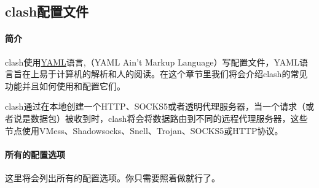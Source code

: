 \subsection{clash配置文件}

\paragraph{简介}clash使用\href{https://yaml.org/}{YAML}语言,（YAML Ain't Markup Language）写配置文件，YAML语言旨在上易于计算机的解析和人的阅读。在这个章节里我们将会介绍clash的常见功能并且如何使用和配置它们。

clash通过在本地创建一个HTTP、SOCKS5或者透明代理服务器，当一个请求（或者说是数据包）被收到时，clash将会将数据路由到不同的远程代理服务器，这些节点使用VMess、Shadowsocks、Snell、Trojan、SOCKS5或HTTP协议。

\paragraph{所有的配置选项}这里将会列出所有的配置选项。你只需要照着做就行了。\\

